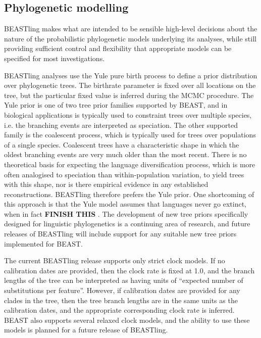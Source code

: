 \documentclass[twocolumn,10pt]{scrartcl}
\begin{document}
\subsection{Phylogenetic modelling}

BEASTling makes what are intended to be sensible high-level decisions about the nature of the probabilistic phylogenetic models underlying its analyses, while still providing sufficient control and flexibility that appropriate models can be specified for most investigations.

BEASTling analyses use the Yule pure birth process to define a prior distribution over phylogenetic trees.  The birthrate parameter is fixed over all locations on the tree, but the particular fixed value is inferred during the MCMC procedure.  The Yule prior is one of two tree prior families supported by BEAST, and in biological applications is typically used to constraint trees over multiple species, i.e. the branching events are interpreted as speciation.  The other supported family is the coalescent process, which is typically used for trees over populations of a single species.  Coalescent trees have a characteristic shape in which the oldest branching events are very much older than the most recent.  There is no theoretical basis for expecting the language diversification process, which is more often analogised to speciation than within-population variation, to yield trees with this shape, nor is there empirical evidence in any established reconstructions.  BEASTling therefore prefers the Yule prior.  One shortcoming of this approach is that the Yule model assumes that languages never go extinct, when in fact \textbf{FINISH THIS} .  The development of new tree priors specifically designed for linguistic phylogenetics is a continuing area of research, and future releases of BEASTling will include support for any suitable new tree priors implemented for BEAST.

The current BEASTling release supports only strict clock models.  If no calibration dates are provided, then the clock rate is fixed at 1.0, and the branch lengths of the tree can be interpreted as having units of ``expected number of substitutions per feature''.  However, if calibration dates are provided for any clades in the tree, then the tree branch lengths are in the same units as the calibration dates, and the appropriate corresponding clock rate is inferred.  BEAST also supports several relaxed clock models\cite{Drummond2006}, and the ability to use these models is planned for a future release of BEASTling.
\end{document}
